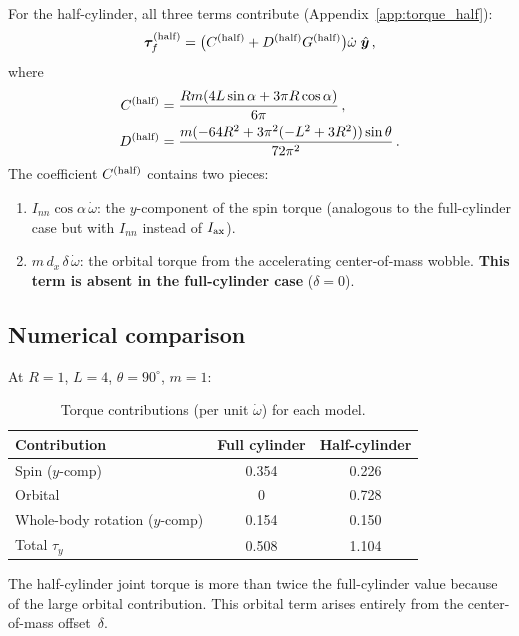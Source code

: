 \documentclass[11pt]{article}
\newcommand{\vect}[1]{\bm{#1}}
\newcommand{\uv}[1]{\hat{\bm{#1}}}
\newcommand{\yhat}{\uv{y}}
\begin{document}
For the half-cylinder, all three terms contribute
(Appendix~\ref{app:torque_half}):
\begin{equation}\label{eq:tau_half}
\vect{\tau}_f^{(\rm half)}
= \bigl(C^{(\rm half)}+D^{(\rm half)}G^{(\rm half)}\bigr)\dot\omega\;\yhat\,,
\end{equation}
where
\begin{align}
C^{(\rm half)} &= \frac{Rm(4L\sin\alpha+3\pi R\cos\alpha)}{6\pi}\,,
  \label{eq:Chalf}\\
D^{(\rm half)} &= \frac{m(-64R^2+3\pi^2(-L^2+3R^2))\sin\theta}{72\pi^2}\,.
  \label{eq:Dhalf}
\end{align}
The coefficient $C^{(\rm half)}$ contains two pieces:
\begin{enumerate}
\item $I_{nn}\cos\alpha\,\dot\omega$: the $y$-component of the spin
  torque (analogous to the full-cylinder case but with $I_{nn}$ instead
  of $I_{\rm ax}$).
\item $m\,d_x\,\delta\,\dot\omega$: the orbital torque from the
  accelerating center-of-mass wobble.  \textbf{This term is absent in
  the full-cylinder case} ($\delta=0$).
\end{enumerate}

\subsection{Numerical comparison}

At $R=1$, $L=4$, $\theta=90^\circ$, $m=1$:

\begin{table}[H]
\centering
\caption{Torque contributions (per unit $\dot\omega$) for each model.}
\label{tab:torque}
\medskip
\begin{tabular}{@{}lcc@{}}
\toprule
Contribution & Full cylinder & Half-cylinder \\
\midrule
Spin ($y$-comp) & 0.354 & 0.226 \\
Orbital & 0 & 0.728 \\
Whole-body rotation ($y$-comp) & 0.154 & 0.150 \\
\midrule
Total $\tau_y$ & 0.508 & 1.104 \\
\bottomrule
\end{tabular}
\end{table}

The half-cylinder joint torque is more than twice the full-cylinder
value because of the large orbital contribution.  This orbital term
arises entirely from the center-of-mass offset~$\delta$.
\end{document}
